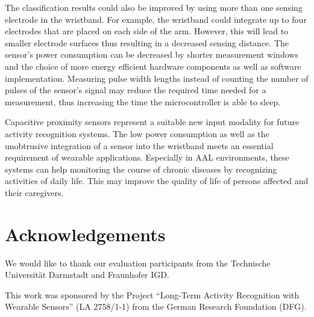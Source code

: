 \documentclass[runningheads,a4paper]{llncs}
\begin{document}
The classification results could also be improved by using more than one sensing electrode in the wristband. For example, the wristband could integrate up to four electrodes that are placed on each side of the arm. However, this will lead to smaller electrode surfaces thus resulting in a decreased sensing distance. The sensor's power consumption can be decreased by shorter measurement windows and the choice of more energy efficient hardware components as well as software implementation. Measuring pulse width lengths instead of counting the number of pulses of the sensor's signal may reduce the required time needed for a measurement, thus increasing the time the microcontroller is able to sleep.

Capacitive proximity sensors represent a suitable new input modality for future activity recognition systems. The low power consumption as well as the unobtrusive integration of a sensor into the wristband meets an essential requirement of wearable applications. Especially in AAL environments, these systems can help monitoring the course of chronic diseases by recognizing activities of daily life. This may improve the quality of life of persons affected and their caregivers. 

\section*{Acknowledgements}

We would like to thank our evaluation participants from the Technische Universit\"at Darmstadt and Fraunhofer IGD.

This work was sponsored by the Project ``Long-Term Activity Recognition with Wearable Sensors'' (LA 2758/1-1) from the German Research Foundation (DFG).



\end{document}
